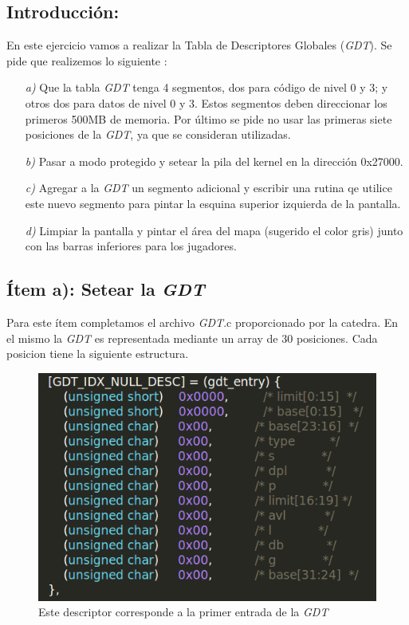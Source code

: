 \subsection{Introducción:}

En este ejercicio vamos a realizar la Tabla de Descriptores Globales (\textit{GDT}). Se pide que realizemos lo siguiente :

\begin{itemize}
\item [\textit{a)}] Que la tabla \textit{GDT} tenga 4 segmentos, dos para código de
nivel 0 y 3; y otros dos para datos de nivel 0 y 3. Estos segmentos deben direccionar los primeros 500MB de memoria. Por último se pide no usar las primeras siete posiciones de la \textit{GDT}, ya que se consideran utilizadas.

\item [\textit{b)}] Pasar a modo protegido y setear la pila del kernel en la dirección 0x27000. 

\item [\textit{c)}] Agregar a la \textit{GDT} un segmento adicional y escribir una rutina qe utilice este nuevo segmento para pintar la esquina superior izquierda de la pantalla.

\item [\textit{d)}] Limpiar la pantalla y pintar el área del mapa (sugerido el color gris) junto con las barras inferiores para los jugadores.
\end{itemize}

\subsection{Ítem a): Setear la \textit{GDT}}

Para este ítem completamos el archivo \textit{GDT}.c proporcionado por la catedra. En el mismo la \textit{GDT} es representada mediante un array de 30 posiciones. Cada posicion tiene la siguiente estructura.
\\

\begin{figure}[H]
\begin{center}
  \includegraphics[width=\linewidth]{ejercicio1/GDTnula.png}
  \caption{{\small Este descriptor corresponde a la primer entrada de la \textit{GDT}}} 
\endminipage
\end{center}
\end{figure}

